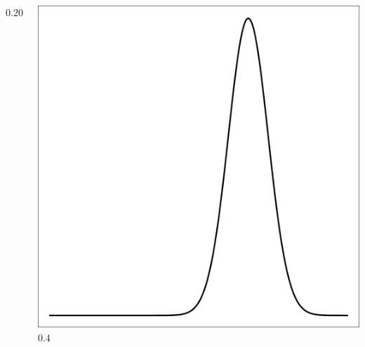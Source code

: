 \documentclass{beamer}
\begin{document}
\begin{frame}[t]
\begin{columns}[c]
\begin{flushright}
                \vspace{10pt}
                \Large $0.20$\\
            \end{flushright}
            \begin{flushright}
                \includegraphics[width=1\textwidth]{bayesian_update_illustration_th3.pdf}\\
                \vspace{10pt}
                \Large $0.4$\\
            \end{flushright}
    \end{columns}
\end{frame}
\end{document}
